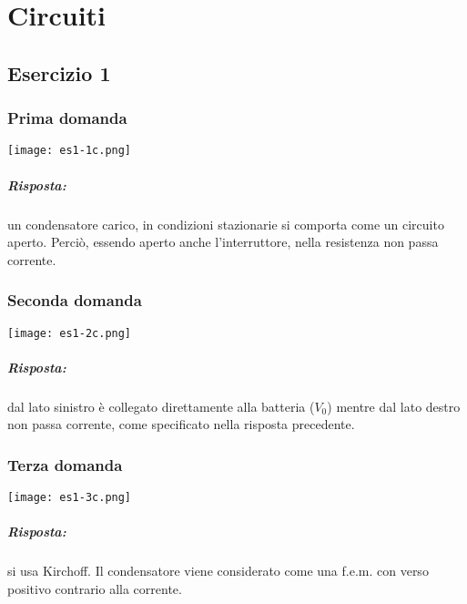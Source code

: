 \chapter{Circuiti}

\section{Esercizio 1}

\subsection{Prima domanda}

\begin{center}
  \texttt{[image: es1-1c.png]}
\end{center}

\paragraph{Risposta:} un condensatore carico, in condizioni stazionarie si comporta come un circuito aperto. Perciò, essendo aperto anche l'interruttore, nella resistenza non passa corrente. 

\subsection{Seconda domanda}

\begin{center}
  \texttt{[image: es1-2c.png]}
\end{center}

\paragraph{Risposta:} dal lato sinistro è collegato direttamente alla batteria ($V_0$) mentre dal lato destro non passa corrente, come specificato nella risposta precedente. 

\subsection{Terza domanda}

\begin{center}
  \texttt{[image: es1-3c.png]}
\end{center}

\paragraph{Risposta:} si usa Kirchoff. Il condensatore viene considerato come una f.e.m. con verso positivo contrario alla corrente. 

